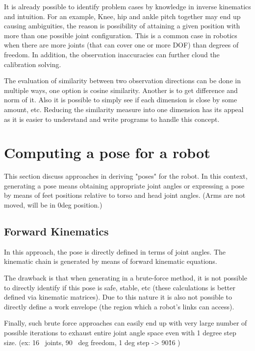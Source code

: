 \documentclass[english, printversion, nomenclature, notitle]{tuvisionthesis} %
\begin{document}
It is already possible to identify problem cases by knowledge in inverse kinematics and intuition. For an example, Knee, hip and ankle pitch together may end up causing ambiguities, the reason is possibility of attaining a given position with more than one possible joint configuration. This is a common case in robotics when there are more joints (that can cover one or more DOF) than degrees of freedom. In addition, the observation inaccuracies can further cloud the calibration solving.

The evaluation of similarity between two observation directions can be done in multiple ways, one option is cosine similarity. Another is to get difference and norm of it. Also it is possible to simply see if each dimension is close by some amount, etc. Reducing the similarity measure into one dimension has its appeal as it is easier to understand and write programs to handle this concept.


\section{Computing a pose for a robot}
This section discuss approaches in deriving "poses" for the robot. In this context, generating a pose means obtaining appropriate joint angles or expressing a pose by means of feet positions relative to torso and head joint angles. (Arms are not moved, will be in 0deg position.)

\subsection{Forward Kinematics}

In this approach, the pose is directly defined in terms of joint angles. The kinematic chain is generated by means of forward kinematic equations.

The drawback is that when generating in a brute-force method, it is not possible to directly identify if this pose is safe, stable, etc (these calculations is better defined via kinematic matrices). Due to this nature it is also not possible to directly define a work envelope (the region which a robot's links can access).

Finally, such brute force approaches can easily end up with very large number of possible iterations to exhaust entire joint angle space even with 1 degree step size. (ex: 16~ joints, 90~ deg freedom, 1 deg step -> 90\^16 ) 
\end{document}
